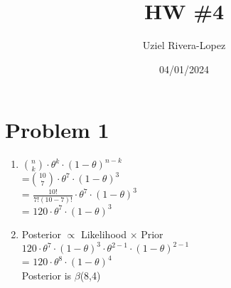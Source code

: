 \documentclass{article}
\title{HW \#4}
\author{
    Uziel Rivera-Lopez
}
\date{04/01/2024}
\begin{document}
\maketitle

\section*{Problem 1}
\begin{enumerate}
    \item $\binom{n}{k} \cdot \theta^k \cdot (1-\theta)^{n-k}$
    \\=$\binom{10}{7} \cdot \theta^7 \cdot (1-\theta)^3$
    \\= $\frac{10!}{7!(10-7)!} \cdot \theta^7 \cdot (1-\theta)^3$
    \\= $120 \cdot \theta^7 \cdot (1-\theta)^3$
    \item Posterior $\propto$ Likelihood $\times$ Prior
    \\$120 \cdot \theta^7 \cdot (1-\theta)^3 \cdot \theta^{2-1} \cdot (1-\theta)^{2-1}$
    \\= $120 \cdot \theta^8 \cdot (1-\theta)^4$
    \\ Posterior is $\beta$(8,4)
\end{enumerate}
\end{document}
